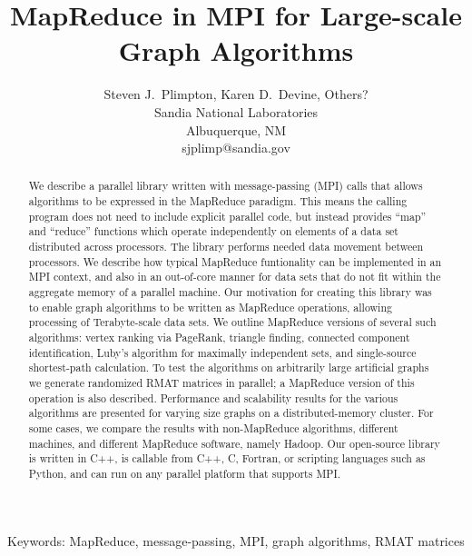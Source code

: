 \documentclass[11pt]{article}
\begin{document}
\title{Map{R}educe in {MPI} for Large-scale Graph Algorithms}

\author{
Steven J.~Plimpton, Karen D.~Devine, Others? \\
Sandia National Laboratories \\
Albuquerque, NM \\
sjplimp@sandia.gov
}

\date{}

\maketitle

\centerline{Keywords: MapReduce, message-passing, MPI, graph
algorithms, RMAT matrices}

\vspace*{0.4in}

\begin{abstract}

We describe a parallel library written with message-passing (MPI)
calls that allows algorithms to be expressed in the MapReduce
paradigm.  This means the calling program does not need to include
explicit parallel code, but instead provides ``map'' and ``reduce''
functions which operate independently on elements of a data set
distributed across processors.  The library performs needed data
movement between processors.  We describe how typical MapReduce
funtionality can be implemented in an MPI context, and also in an
out-of-core manner for data sets that do not fit within the aggregate
memory of a parallel machine.  Our motivation for creating this
library was to enable graph algorithms to be written as MapReduce
operations, allowing processing of Terabyte-scale data sets.  We
outline MapReduce versions of several such algorithms: vertex ranking
via PageRank, triangle finding, connected component identification,
Luby's algorithm for maximally independent sets, and single-source
shortest-path calculation.  To test the algorithms on arbitrarily
large artificial graphs we generate randomized RMAT matrices in
parallel; a MapReduce version of this operation is also described.
Performance and scalability results for the various algorithms are
presented for varying size graphs on a distributed-memory cluster.
For some cases, we compare the results with non-MapReduce algorithms,
different machines, and different MapReduce software, namely Hadoop.
Our open-source library is written in C++, is callable from C++, C,
Fortran, or scripting languages such as Python, and can run on any
parallel platform that supports MPI.

\end{abstract}

\pagebreak











\end{document}
